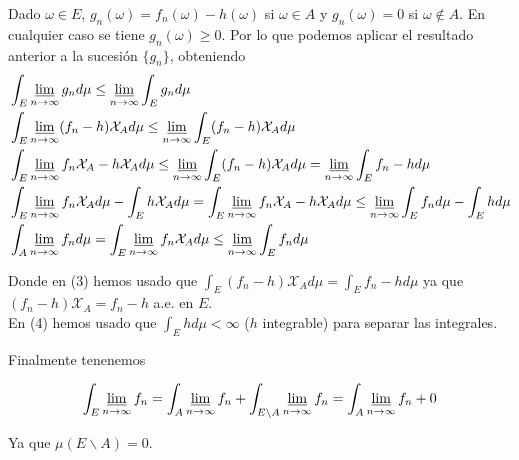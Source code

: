 \documentclass{article}
\begin{document}
Dado $\omega \in E$, $g_n(\omega)=f_n(\omega)-h(\omega)$ si
$\omega \in A$ y $g_n(\omega)=0$ si $\omega \notin A$. En cualquier
caso se tiene $g_n(\omega) \geq 0$. Por lo que podemos aplicar el
resultado anterior a la sucesión $\{g_n\}$, obteniendo
\begin{align}
  &\int_E\varliminf\limits_{n\to\infty} g_n d\mu \leq \varliminf\limits_{n\to\infty} \int_Eg_nd\mu \\
  &\int_E\varliminf\limits_{n\to\infty} (f_n-h)\mathcal{X}_A d\mu \leq \varliminf\limits_{n\to\infty} \int_E(f_n-h)\mathcal{X}_A d\mu \\
  &\int_E\varliminf\limits_{n\to\infty} f_n\mathcal{X}_A - h\mathcal{X}_A d\mu \leq \varliminf\limits_{n\to\infty} \int_E(f_n-h)\mathcal{X}_A d\mu = \varliminf\limits_{n\to\infty} \int_Ef_n-h d\mu \\
  &\int_E \varliminf\limits_{n\to\infty} f_n\mathcal{X}_A d\mu - \int_Eh\mathcal{X}_A d\mu = \int_E\varliminf\limits_{n\to\infty} f_n\mathcal{X}_A - h\mathcal{X}_A d\mu \leq \varliminf\limits_{n\to\infty} \int_Ef_n d\mu - \int_Eh d\mu \\
  &\int_A \varliminf\limits_{n\to\infty} f_n d\mu = \int_E \varliminf\limits_{n\to\infty} f_n\mathcal{X}_A d\mu \leq \varliminf\limits_{n\to\infty} \int_Ef_n d\mu
\end{align}

Donde en (3) hemos usado que
$\int_E(f_n-h)\mathcal{X}_A d\mu = \int_Ef_n-h d\mu$ ya que
$(f_n-h)\mathcal{X}_A = f_n-h$ a.e. en $E$. \\
En (4) hemos usado que $\int_Eh d\mu < \infty$ ($h$ integrable) para
separar las integrales.

Finalmente tenenemos

\[\int_E \varliminf\limits_{n\to\infty} f_n = \int_A \varliminf\limits_{n\to\infty} f_n + \int_{E\backslash A}\varliminf\limits_{n\to\infty} f_n = \int_A \varliminf\limits_{n\to\infty} f_n + 0\]

Ya que $\mu(E\backslash A)=0$.

\hfill\qedsymbol
\end{document}
